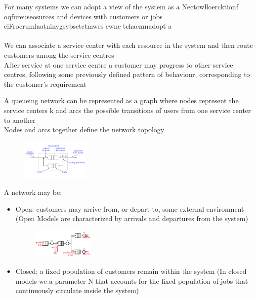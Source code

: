 \documentclass[10pt, oneside]{article}
\begin{document}
\begin{itemize}
\begin{figure}[H]
\end{figure}For many systems we can adopt a view of the system as a
Nectowlloercktionf oqfureuseosurces and devices with customers or jobs
ciFrocrumlaatninygsybsetetmwes ewne tchaenmadopt a\\\\We can associate a service center with each resource in the system and then route customers among the service centres\\After service at one service centre a customer may progress to other service centres, following some previously defined pattern of behaviour, corresponding to the customer’s requirement
\begin{multicols}{2}
    A queueing network can be represented as a graph where nodes represent the service centers k and arcs the possible transitions of users from one service center to another\\ Nodes and arcs together define the network topology\columnbreak
    \begin{figure}[H]
    \begin{center}
        \includegraphics[width=0.3\textwidth]{img/img102.png}
        \end{center}
    \end{figure}
\end{multicols}A network may be:\begin{itemize}
    \item Open: customers may arrive from, or depart to, some external environment (Open Models are characterized by arrivals and departures from the system)\begin{figure}[H]
        \begin{center}
            \includegraphics[width=0.28\textwidth]{img/img103.png}
            \end{center}
        \end{figure}
    \item Closed: a fixed population of customers remain within the system (In closed models we a parameter N that accounts for the fixed population of jobs that continuously circulate inside the system)\begin{figure}[H]

\end{figure}
\end{itemize}
\end{itemize}
\end{document}
